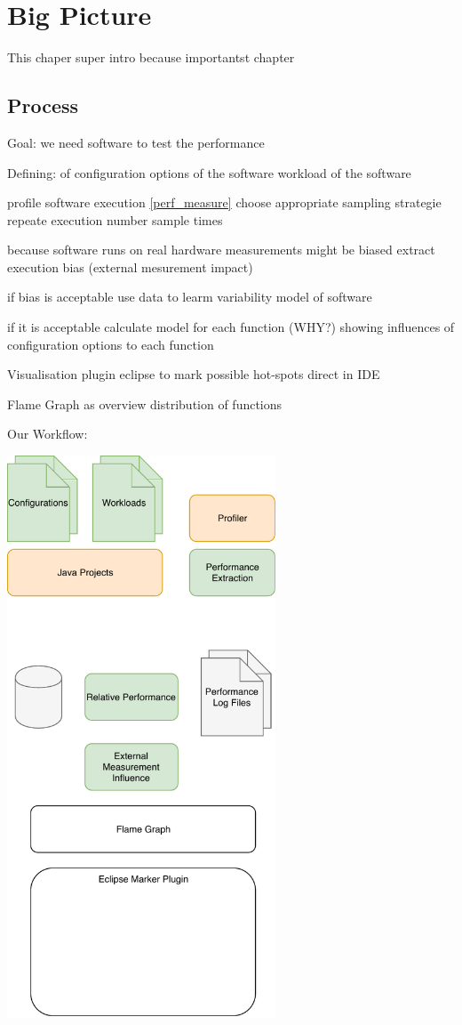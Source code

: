 \chapter{Big Picture}
\label{chap:method}
This chaper super intro because importantst chapter


\section{Process}

Goal: we need software to test the performance 

Defining: of configuration options of the software
workload of the software

profile software execution \ref{perf_measure}
choose appropriate sampling strategie
repeate execution number sample times

because software runs on real hardware measurements might be biased
extract execution bias (external mesurement impact)

if bias is acceptable use data to learm variability model of software 

if it is acceptable calculate model for each function (WHY?)
showing influences of configuration options to each function

Visualisation plugin eclipse to mark possible hot-spots direct in IDE

Flame Graph as overview distribution of functions



Our Workflow:

\includegraphics[width=0.6\textwidth]{images/Workflow}

